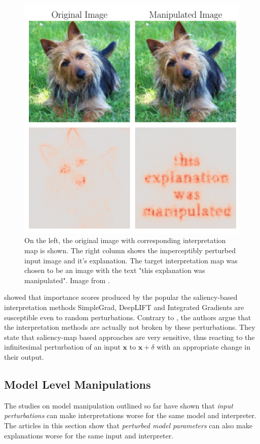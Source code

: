 \begin{figure}[ht]
    \centering
    \includegraphics[width=0.8\linewidth]{figures/dombr.png}
    \caption{On the left, the original image with corresponding interpretation map is shown. The right column shows the imperceptibly perturbed input image and it's explanation. The target interpretation map was chosen to be an image with the text "this explanation was manipulated". Image from \cite{dombrowski2019explanations}.}\label{fig:dombr}
    \vspace{-0.3cm}
\end{figure}

\cite{ghorbani2019interpretation} showed that importance scores produced by the popular the saliency-based interpretation methods SimpleGrad, DeepLIFT and Integrated Gradients are susceptible even to random perturbations. Contrary to \cite{dombrowski2019explanations}, the authors argue that the interpretation methods are actually not broken by these perturbations. They state that saliency-map based approaches are very sensitive, thus reacting to the infinitesimal perturbation of an input $\mathbf{x}$ to $\mathbf{x}+\delta$ with an appropriate change in their output.

\subsection{Model Level Manipulations}
The studies on model manipulation outlined so far have shown that \textit{input perturbations} can make interpretations worse for the same model and interpreter. The articles in this section show that \textit{perturbed model parameters} can also make explanations worse for the same input and interpreter.

